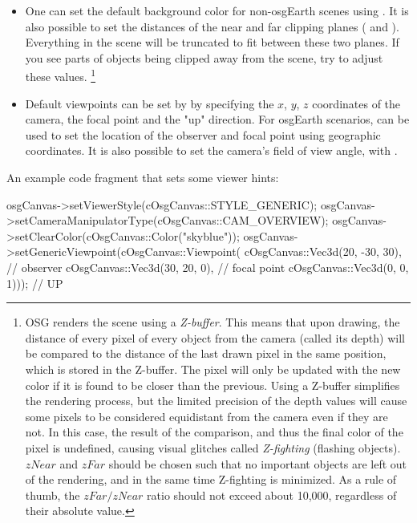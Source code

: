 \begin{itemize}
\item {} One can set the default background color for
    non-osgEarth scenes using . It is also possible
    to set the distances of the near and far clipping planes
    ( and ). Everything in the scene will
    be truncated to fit between these two planes. If you see parts of objects
    being clipped away from the scene, try to adjust these values.
    \footnote{OSG renders the scene using a \textit{Z-buffer}. This means
    that upon drawing, the distance of every pixel of every object from the
    camera (called its depth) will be compared to the distance of the last
    drawn pixel in the same position, which is stored in the Z-buffer. The
    pixel will only be updated with the new color if it is found to be closer
    than the previous. Using a Z-buffer simplifies the rendering process,
    but the limited precision of the depth values will cause some pixels to
    be considered equidistant from the camera even if they are not. In this
    case, the result of the comparison, and thus the final color of the pixel
    is undefined, causing visual glitches called \textit{Z-fighting}
    (flashing objects). $zNear$ and $zFar$ should be chosen such that no
    important objects are left out of the rendering, and in the same time
    Z-fighting is minimized. As a rule of thumb, the $zFar/zNear$
    ratio should not exceed about 10,000, regardless of their absolute value.}

\item {}
    Default viewpoints can be set by 
    by specifying the $x$, $y$, $z$ coordinates of the camera, the focal
    point and the "up" direction. For osgEarth scenarios,
     can be used to set the
    location of the observer and focal point using geographic coordinates. It
    is also possible to set the camera's field of view angle, with
    .

\end{itemize}

An example code fragment that sets some viewer hints:

\begin{cpp}
osgCanvas->setViewerStyle(cOsgCanvas::STYLE_GENERIC);
osgCanvas->setCameraManipulatorType(cOsgCanvas::CAM_OVERVIEW);
osgCanvas->setClearColor(cOsgCanvas::Color("skyblue"));
osgCanvas->setGenericViewpoint(cOsgCanvas::Viewpoint(
        cOsgCanvas::Vec3d(20, -30, 30), // observer
        cOsgCanvas::Vec3d(30, 20, 0),   // focal point
        cOsgCanvas::Vec3d(0, 0, 1)));   // UP
\end{cpp}


